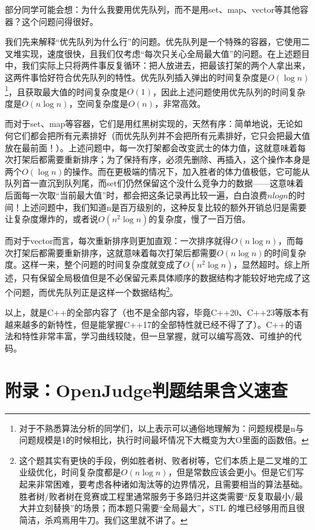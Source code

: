 \documentclass[../main.tex]{subfiles}
\begin{document}
\begin{note}
  部分同学可能会想：为什么我要用优先队列，而不是用set、map、vector等其他容器？这个问题问得很好。

  我们先来解释“优先队列为什么行”的问题。优先队列是一个特殊的容器，它使用二叉堆实现，速度很快，且我们仅考虑“每次只关心全局最大值”的问题。在上述题目中，我们实际上只将两件事反复循环：把人放进去，把最该打架的两个人拿出来，这两件事恰好符合优先队列的特性。优先队列插入弹出的时间复杂度是$O(\log n)$\footnote{对于不熟悉算法分析的同学们，以上表示可以通俗地理解为：问题规模是n与问题规模是1的时候相比，执行时间最坏情况下大概变为大O里面的函数倍。}，且获取最大值的时间复杂度是$O(1)$，因此上述问题使用优先队列的时间复杂度是$O(n \log n)$，空间复杂度是$O(n)$，非常高效。

  而对于set、map等容器，它们是用红黑树实现的，天然有序：简单地说，无论如何它们都会把所有元素排好（而优先队列并不会把所有元素排好，它只会把最大值放在最前面！）。上述问题中，每一次打架都会改变武士的体力值，这就意味着每次打架后都需要重新排序；为了保持有序，必须先删除、再插入，这个操作本身是两个$O(\log n)$的操作。而在更极端的情况下，加入胜者的体力值极低，它可能从队列首一直沉到队列尾，而set们仍然保留这个没什么竞争力的数据——这意味着后面每一次取“当前最大值”时，都会把这条记录再比较一遍，白白浪费$n log n $的时间！上述问题中，我们知道n是百万级别的，这种反复比较的额外开销总归是需要让复杂度爆炸的，或者说$O(n^2 \log n)$的复杂度，慢了一百万倍。

  而对于vector而言，每次重新排序则更加直观：一次排序就得$O(n \log n)$，而每次打架后都需要重新排序，这就意味着每次打架后都需要$O(n \log n)$的时间复杂度。这样一来，整个问题的时间复杂度就变成了$O(n^2 \log n)$，显然超时。综上所述，只有保留全局极值但是不必保留元素具体顺序的数据结构才能较好地完成了这个问题，而优先队列正是这样一个数据结构\footnote{这个题其实有更快的手段，例如胜者树、败者树等，它们本质上是二叉堆的工业级优化，时间复杂度都是$O(n \log n)$，但是常数应该会更小。但是它们写起来非常困难，要考虑各种诸如淘汰等的边界情况，且需要相当的算法基础。胜者树/败者树在竞赛或工程里通常服务于多路归并这类需要“反复取最小/最大并立刻替换”的场景；而本题只需要“全局最大”，STL 的堆已经够用而且很简洁，杀鸡焉用牛刀。我们这里就不讲了。}。
\end{note}

以上，就是C++的全部内容了（也不是全部内容，毕竟C++20、C++23等版本有越来越多的新特性，但是能掌握C++17的全部特性就已经不得了了）。C++的语法和特性非常丰富，学习曲线较陡，但一旦掌握，就可以编写高效、可维护的代码。

\section{附录：OpenJudge判题结果含义速查}
\end{document}

